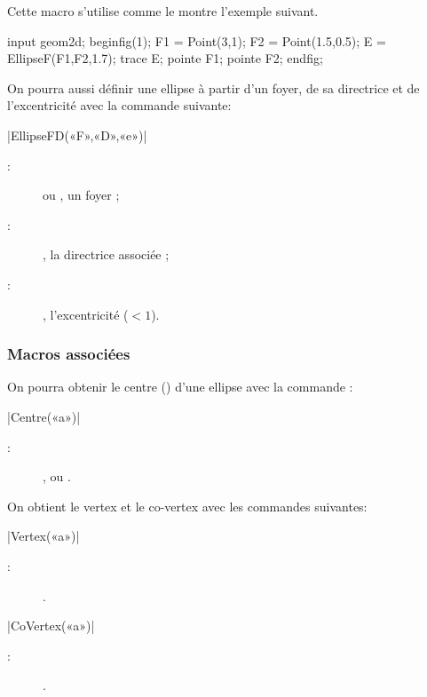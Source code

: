 \documentclass[a4paper,french]{article}
\begin{document}
Cette macro s'utilise comme le montre l'exemple suivant.
\begin{ExempleMP}
input geom2d;
beginfig(1);
F1 = Point(3,1);
F2 = Point(1.5,0.5);
E = EllipseF(F1,F2,1.7);
trace E;
pointe F1; pointe F2;
endfig;
\end{ExempleMP}

On pourra aussi définir une ellipse à partir d’un foyer, de sa directrice et de
l’excentricité avec la commande suivante: 
\begin{colourband}
\macro|EllipseFD(«F»,«D»,«e»)|
\begin{description}
  \item[:]   ou , un foyer ;
  \item[:]  , la directrice associée ;
  \item[:]  , l’excentricité ($<1$).
\end{description}
\end{colourband}
\bigskip

\subsubsection{Macros associées}

On pourra obtenir le centre () d'une ellipse avec la commande :
\begin{colourband}
  \macro|Centre(«a»)|
  \begin{description}
    \item[:]  ,  ou .
  \end{description}
\end{colourband}

On obtient le vertex et le co-vertex avec les commandes suivantes:
\begin{colourband}
\macro|Vertex(«a»)|
\begin{description}
  \item[:]  .
\end{description}
\end{colourband}
\bigskip

\begin{colourband}
\macro|CoVertex(«a»)|
\begin{description}
  \item[:]  .
\end{description}
\end{colourband}
\bigskip
\end{document}
